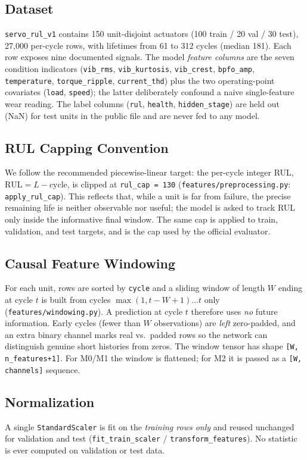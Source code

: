 \documentclass[11pt,a4paper]{article}
\newcommand{\code}[1]{\texttt{\small #1}}
\begin{document}
\subsection{Dataset}
\code{servo\_rul\_v1} contains 150 unit-disjoint actuators (100 train / 20 val /
30 test), 27{,}000 per-cycle rows, with lifetimes from 61 to 312 cycles
(median 181). Each row exposes nine documented signals. The model
\emph{feature columns} are the seven condition indicators
(\code{vib\_rms}, \code{vib\_kurtosis}, \code{vib\_crest}, \code{bpfo\_amp},
\code{temperature}, \code{torque\_ripple}, \code{current\_thd}) plus the two
operating-point covariates (\code{load}, \code{speed}); the latter deliberately
confound a naive single-feature wear reading. The label columns
(\code{rul}, \code{health}, \code{hidden\_stage}) are held out (NaN) for test
units in the public file and are never fed to any model.

\subsection{RUL Capping Convention}
We follow the recommended piecewise-linear target: the per-cycle integer RUL,
$\mathrm{RUL}=L-\text{cycle}$, is clipped at \code{rul\_cap = 130}
(\code{features/preprocessing.py}: \code{apply\_rul\_cap}). This reflects that,
while a unit is far from failure, the precise remaining life is neither
observable nor useful; the model is asked to track RUL only inside the
informative final window. The same cap is applied to train, validation, and test
targets, and is the cap used by the official evaluator.

\subsection{Causal Feature Windowing}
For each unit, rows are sorted by \code{cycle} and a sliding window of length $W$
ending at cycle $t$ is built from cycles $\max(1, t-W+1)\dots t$ only
(\code{features/windowing.py}). A prediction at cycle $t$ therefore uses
\emph{no} future information. Early cycles (fewer than $W$ observations) are
\emph{left} zero-padded, and an extra binary channel marks real vs.\ padded
rows so the network can distinguish genuine short histories from zeros. The
window tensor has shape \code{[W, n\_features+1]}. For M0/M1 the window is
flattened; for M2 it is passed as a \code{[W, channels]} sequence.

\subsection{Normalization}
A single \code{StandardScaler} is fit on the \emph{training rows only} and reused
unchanged for validation and test (\code{fit\_train\_scaler} /
\code{transform\_features}). No statistic is ever computed on validation or test
data.
\end{document}

